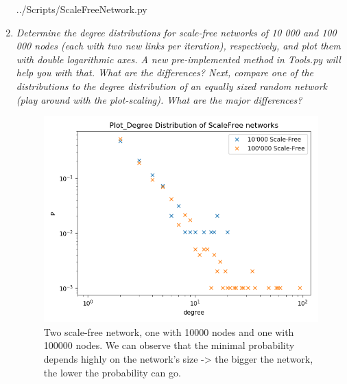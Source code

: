 \documentclass[10pt,a4paper]{article}
\begin{document}
\begin{enumerate}
\newpage
 {../Scripts/ScaleFreeNetwork.py}


\item \textit{Determine the degree distributions for scale-free networks of 10 000 and 100 000 nodes
	(each with two new links per iteration), respectively, and plot them with double logarithmic
	axes. A new pre-implemented method in Tools.py will help you with that. What are the
	differences?
	Next, compare one of the distributions to the degree distribution of an equally sized random
	network (play around with the plot-scaling). What are the major differences?
}\\




\begin{figure}[H]
	\centering
	\includegraphics[width=0.7\linewidth]{"../Scripts/Plot_Degree Distribution of ScaleFree networks"}
	\caption{Two scale-free network, one with 10000 nodes and one with 100000 nodes. We can observe that the minimal probability depends highly on the network's size -> the bigger the network, the lower the probability can go.}
	\label{fig:plotdegree-distribution-of-scalefree-networks}
\end{figure}



\end{enumerate}
\end{document}
